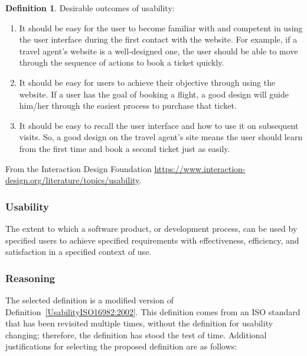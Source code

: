 \documentclass[letterpaper, cleveref]{lipics-v2019}
\theoremstyle{definition}
\newtheorem{defn}{Definition}
\begin{document}
\begin{defn} \label{UsabilityDesFoundation}
Desirable outcomes of usability:
\begin{enumerate}
\item It should be easy for the user to become familiar with and competent in
using the user interface during the first contact with the website. For
example, if a travel agent's website is a well-designed one, the user should
be able to move through the sequence of actions to book a ticket quickly.
\item It should be easy for users to achieve their objective through using the
  website. If a user has the goal of booking a flight, a good design will guide
  him/her through the easiest process to purchase that ticket.
\item It should be easy to recall the user interface and how to use it on
  subsequent visits. So, a good design on the travel agent's site means the user
  should learn from the first time and book a second ticket just as easily.
\end{enumerate}
From the Interaction Design Foundation
\url{https://www.interaction-design.org/literature/topics/usability}.
\end{defn}


\begin{mybox}
\subsubsection*{Usability}
The extent to which a software product, or development process, can be used by
specified users to achieve specified requirements with effectiveness,
efficiency, and satisfaction in a specified context of use. 
\end{mybox}

\subsubsection*{Reasoning}

The selected definition is a modified version of
Definition~\ref{UsabilityISO16982:2002}.  This definition comes from an ISO
standard that has been revisited multiple times, without the definition for
usability changing; therefore, the definition has stood the test of time.
Additional justifications for selecting the proposed definition are as follows:
\end{document}

